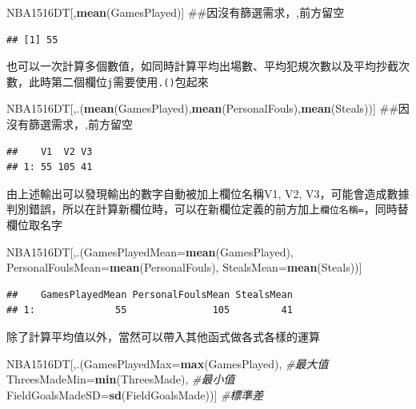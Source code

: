 \documentclass[]{book}
\newenvironment{Shaded}{\begin{snugshade}}{\end{snugshade}}
\newcommand{\KeywordTok}[1]{\textcolor[rgb]{0.13,0.29,0.53}{\textbf{{#1}}}}
\newcommand{\DataTypeTok}[1]{\textcolor[rgb]{0.13,0.29,0.53}{{#1}}}
\newcommand{\CommentTok}[1]{\textcolor[rgb]{0.56,0.35,0.01}{\textit{{#1}}}}
\newcommand{\NormalTok}[1]{{#1}}
\theoremstyle{definition}
\theoremstyle{definition}
\theoremstyle{remark}
\begin{document}
\begin{Shaded}
\begin{Highlighting}[]
\NormalTok{NBA1516DT[,}\KeywordTok{mean}\NormalTok{(GamesPlayed)] ##因沒有篩選需求，,前方留空}
\end{Highlighting}
\end{Shaded}

\begin{verbatim}
## [1] 55
\end{verbatim}

也可以一次計算多個數值，如同時計算平均出場數、平均犯規次數以及平均抄截次數，此時第二個欄位\texttt{j}需要使用\texttt{.()}包起來

\begin{Shaded}
\begin{Highlighting}[]
\NormalTok{NBA1516DT[,.(}\KeywordTok{mean}\NormalTok{(GamesPlayed),}\KeywordTok{mean}\NormalTok{(PersonalFouls),}\KeywordTok{mean}\NormalTok{(Steals))] ##因沒有篩選需求，,前方留空}
\end{Highlighting}
\end{Shaded}

\begin{verbatim}
##    V1  V2 V3
## 1: 55 105 41
\end{verbatim}

由上述輸出可以發現輸出的數字自動被加上欄位名稱V1, V2,
V3，可能會造成數據判別錯誤，所以在計算新欄位時，可以在新欄位定義的前方加上\texttt{欄位名稱=}，同時替欄位取名字

\begin{Shaded}
\begin{Highlighting}[]
\NormalTok{NBA1516DT[,.(}\DataTypeTok{GamesPlayedMean=}\KeywordTok{mean}\NormalTok{(GamesPlayed),}
             \DataTypeTok{PersonalFoulsMean=}\KeywordTok{mean}\NormalTok{(PersonalFouls),}
             \DataTypeTok{StealsMean=}\KeywordTok{mean}\NormalTok{(Steals))]}
\end{Highlighting}
\end{Shaded}

\begin{verbatim}
##    GamesPlayedMean PersonalFoulsMean StealsMean
## 1:              55               105         41
\end{verbatim}

除了計算平均值以外，當然可以帶入其他函式做各式各樣的運算

\begin{Shaded}
\begin{Highlighting}[]
\NormalTok{NBA1516DT[,.(}\DataTypeTok{GamesPlayedMax=}\KeywordTok{max}\NormalTok{(GamesPlayed), }\CommentTok{#最大值}
             \DataTypeTok{ThreesMadeMin=}\KeywordTok{min}\NormalTok{(ThreesMade), }\CommentTok{#最小值}
             \DataTypeTok{FieldGoalsMadeSD=}\KeywordTok{sd}\NormalTok{(FieldGoalsMade))] }\CommentTok{#標準差}
\end{Highlighting}
\end{Shaded}
\end{document}
